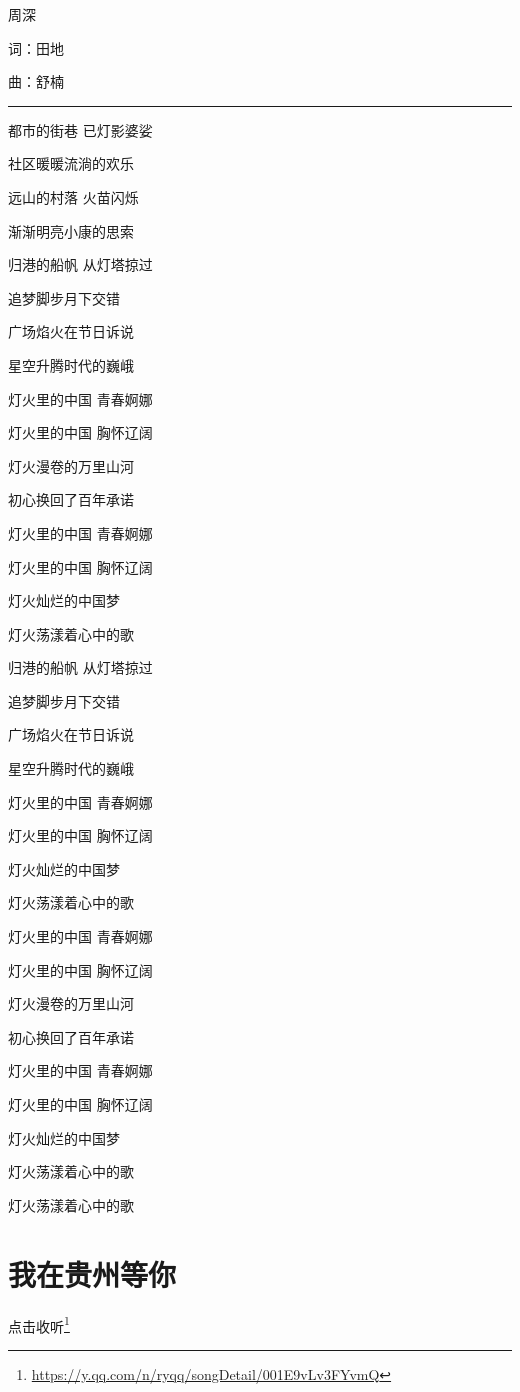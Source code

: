 \documentclass[]{ctexbook}
\renewcommand{\href}[2]{#2\footnote{\url{#1}}}
\begin{document}
周深

词：田地

曲：舒楠

\begin{center}\rule{0.5\linewidth}{0.5pt}\end{center}

都市的街巷 已灯影婆娑

社区暖暖流淌的欢乐

远山的村落 火苗闪烁

渐渐明亮小康的思索

归港的船帆 从灯塔掠过

追梦脚步月下交错

广场焰火在节日诉说

星空升腾时代的巍峨

灯火里的中国 青春婀娜

灯火里的中国 胸怀辽阔

灯火漫卷的万里山河

初心换回了百年承诺

灯火里的中国 青春婀娜

灯火里的中国 胸怀辽阔

灯火灿烂的中国梦

灯火荡漾着心中的歌

归港的船帆 从灯塔掠过

追梦脚步月下交错

广场焰火在节日诉说

星空升腾时代的巍峨

灯火里的中国 青春婀娜

灯火里的中国 胸怀辽阔

灯火灿烂的中国梦

灯火荡漾着心中的歌

灯火里的中国 青春婀娜

灯火里的中国 胸怀辽阔

灯火漫卷的万里山河

初心换回了百年承诺

灯火里的中国 青春婀娜

灯火里的中国 胸怀辽阔

灯火灿烂的中国梦

灯火荡漾着心中的歌

灯火荡漾着心中的歌

\section*{我在贵州等你}\label{waitting-in-guizhou}


\href{https://y.qq.com/n/ryqq/songDetail/001E9vLv3FYvmQ}{点击收听}
\end{document}
